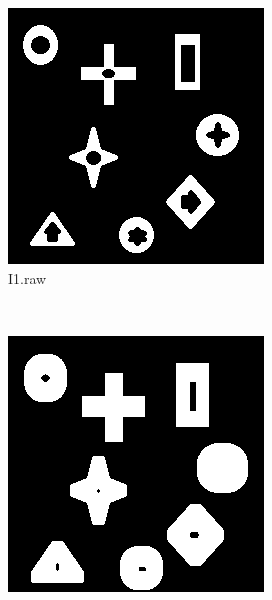 \documentclass{article}
\begin{document}
\begin{enumerate}[label=(\alph*)]
        \begin{figure}[!htb]
            \centering
            \begin{subfigure}[b]{0.3\textwidth}
                \includegraphics[width=\textwidth]{img/I1.png}
                \caption{I1.raw}
            \end{subfigure}
            ~
            \begin{subfigure}[b]{0.3\textwidth}
                \includegraphics[width=\textwidth]{img/Dilated.png}

\end{subfigure}
\end{figure}
\end{enumerate}
\end{document}
